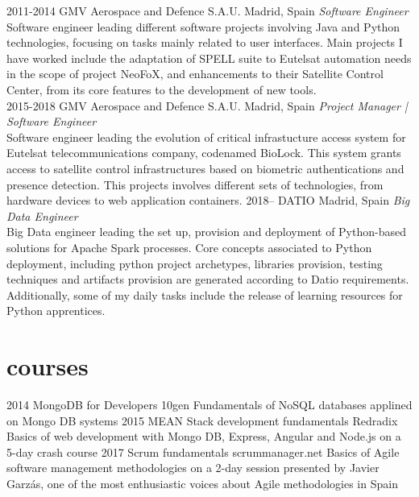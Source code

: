 \documentclass[]{friggeri-cv}
\begin{document}
\begin{entrylist}
\entry
{2011-2014}
{GMV Aerospace and Defence S.A.U.}
{Madrid, Spain}
{\emph{Software Engineer} \\
Software engineer leading different software projects involving Java and Python technologies, focusing on tasks mainly related to user interfaces.
Main projects I have worked include the adaptation of SPELL suite to Eutelsat automation needs in the scope of project NeoFoX, and enhancements to
their Satellite Control Center, from its core features to the development of new tools.} \\
\entry
{2015-2018}
{GMV Aerospace and Defence S.A.U.}
{Madrid, Spain}
{\emph{Project Manager | Software Engineer} \\
Software engineer leading the evolution of critical infrastucture access system for Eutelsat telecommunications company, codenamed BioLock. This system
grants access to satellite control infrastructures based on biometric authentications and presence detection.
This projects involves different sets of technologies, from hardware devices to web application containers.}
\entry
{2018--}
{DATIO}
{Madrid, Spain}
{\emph{Big Data Engineer} \\
Big Data engineer leading the set up, provision and deployment of Python-based solutions for Apache Spark processes.
Core concepts associated to Python deployment, including python project archetypes, libraries provision, testing techniques and artifacts provision are
generated according to Datio requirements. Additionally, some of my daily tasks include the release of learning resources for Python apprentices.}
\end{entrylist}


\section{courses}

\begin{entrylist}
\entry
{2014}
{MongoDB for Developers}
{10gen}
{Fundamentals of NoSQL databases applined on Mongo DB systems}
\entry
{2015}
{MEAN Stack development fundamentals}
{Redradix}
{Basics of web development with Mongo DB, Express, Angular and Node.js on a 5-day crash course}
\entry
{2017}
{Scrum fundamentals}
{scrummanager.net}
{Basics of Agile software management methodologies on a 2-day session presented by Javier Garzás, one of the most enthusiastic voices about Agile methodologies in Spain}
\end{entrylist}
\end{document}
